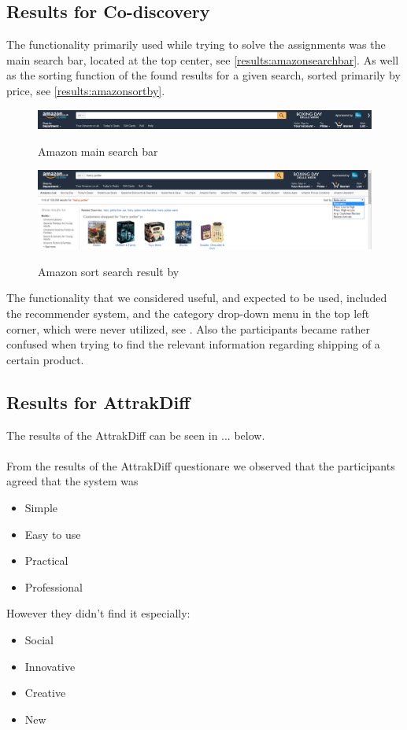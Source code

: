 \subsection{Results for Co-discovery}
The functionality primarily used while trying to solve the assignments was the main search bar, located at the top center, see \autoref{results:amazonsearchbar}. As well as the sorting function of the found results for a given search, sorted primarily by price, see \autoref{results:amazonsortby}.

\begin{figure}[h]
\includegraphics[scale=0.3]{./includes/amazon_search_bar.png}
\label{results:amazonsearchbar}
\caption{Amazon main search bar}
\end{figure}

\begin{figure}[h]
\includegraphics[scale=0.3]{./includes/amazon_sort_by.png}
\label{results:amazonsortby}
\caption{Amazon sort search result by}
\end{figure}

The functionality that we considered useful, and expected to be used, included the recommender system, and the category drop-down menu in the top left corner, which were never utilized, see . Also the participants became rather confused when trying to find the relevant information regarding shipping of a certain product.

\subsection{Results for AttrakDiff}
The results of the AttrakDiff can be seen in ... below. \\

 \\

From the results of the AttrakDiff questionare we observed that the participants agreed that the system was
\begin{itemize}
\item Simple
\item Easy to use
\item Practical
\item Professional
\end{itemize}
However they didn't find it especially:
\begin{itemize}
\item Social
\item Innovative
\item Creative
\item New
\end{itemize}